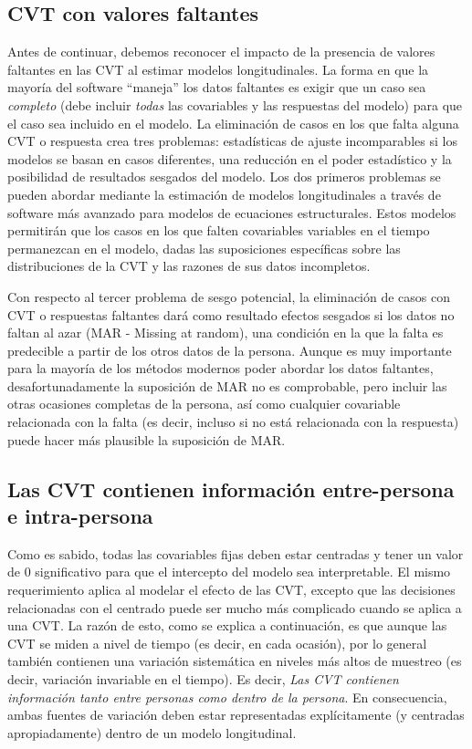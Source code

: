 \documentclass[spanish]{article}
\numberwithin{figure}{subsection}
\numberwithin{equation}{subsection}
\numberwithin{table}{subsection}
\begin{document}
\subsection{CVT con valores faltantes}

Antes de continuar, debemos reconocer el impacto de la presencia de valores
faltantes en las CVT al estimar modelos longitudinales. La forma en que la
mayoría del software ``maneja'' los datos faltantes es exigir que un caso sea
\textit{completo} (debe incluir \textit{todas} las covariables y las respuestas
del modelo) para que el caso sea incluido en el modelo. La eliminación de casos
en los que falta alguna CVT o respuesta crea tres problemas: estadísticas de
ajuste incomparables si los modelos se basan en casos diferentes, una reducción
en el poder estadístico y la posibilidad de resultados sesgados del modelo. Los
dos primeros problemas se pueden abordar mediante la estimación de modelos
longitudinales a través de software más avanzado para modelos de ecuaciones
estructurales. Estos modelos permitirán que los casos en los que falten
covariables variables en el tiempo permanezcan en el modelo, dadas las
suposiciones específicas sobre las distribuciones de la CVT y las razones de
sus datos incompletos.

Con respecto al tercer problema de sesgo potencial, la eliminación de casos con
CVT o respuestas faltantes dará como resultado efectos sesgados si los datos no
faltan al azar (MAR - Missing at random), una condición en la que la falta es
predecible a partir de los otros datos de la persona. Aunque es muy importante
para la mayoría de los métodos modernos poder abordar los datos faltantes,
desafortunadamente la suposición de MAR no es comprobable, pero incluir las
otras ocasiones completas de la persona, así como cualquier covariable
relacionada con la falta (es decir, incluso si no está relacionada con la
respuesta) puede hacer más plausible la suposición de MAR.

\subsection{Las CVT contienen información entre-persona e intra-persona}

Como es sabido, todas las covariables fijas deben estar centradas y tener un
valor de 0 significativo para que el intercepto del modelo sea interpretable.
El mismo requerimiento aplica al modelar el efecto de las CVT, excepto que las
decisiones relacionadas con el centrado puede ser mucho más complicado cuando
se aplica a una CVT. La razón de esto, como se explica a continuación, es que
aunque las CVT se miden a nivel de tiempo (es decir, en cada ocasión), por lo
general también contienen una variación sistemática en niveles más altos de
muestreo (es decir, variación invariable en el tiempo). Es decir, \textit{Las
CVT contienen información tanto entre personas como dentro de la persona}. En
consecuencia, ambas fuentes de variación deben estar representadas
explícitamente (y centradas apropiadamente) dentro de un modelo longitudinal.
\end{document}
